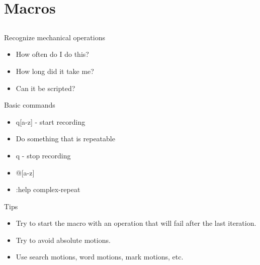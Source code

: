 \documentclass{beamer}
\begin{document}
    \section{Macros}
    \subsection{}
    \begin{frame}{Recognize mechanical operations}
        \begin{itemize}
            \item How often do I do this?
            \item How long did it take me?
            \item Can it be scripted?
        \end{itemize}
    \end{frame}
    \begin{frame}{Basic commands}
        \begin{itemize}
            \item q[a-z] - start recording
            \item Do something that is repeatable
            \item q - stop recording
            \item @[a-z]
            \item :help complex-repeat
        \end{itemize}
    \end{frame}
    \begin{frame}{Tips}
        \begin{itemize}
            \item Try to start the macro with an operation that will fail after the last iteration.
            \item Try to avoid absolute motions.
            \item Use search motions, word motions, mark motions, etc.
        \end{itemize}
    \end{frame}
\end{document}
